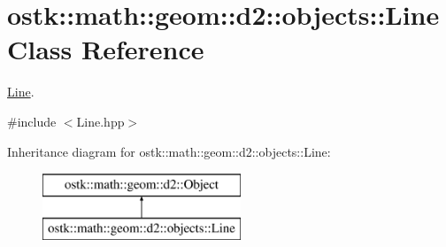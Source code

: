 \hypertarget{classostk_1_1math_1_1geom_1_1d2_1_1objects_1_1_line}{}\section{ostk\+:\+:math\+:\+:geom\+:\+:d2\+:\+:objects\+:\+:Line Class Reference}
\label{classostk_1_1math_1_1geom_1_1d2_1_1objects_1_1_line}


\hyperlink{classostk_1_1math_1_1geom_1_1d2_1_1objects_1_1_line}{Line}.  




{\ttfamily \#include $<$Line.\+hpp$>$}

Inheritance diagram for ostk\+:\+:math\+:\+:geom\+:\+:d2\+:\+:objects\+:\+:Line\+:\begin{figure}[H]
\begin{center}
\leavevmode
\includegraphics[height=2.000000cm]{classostk_1_1math_1_1geom_1_1d2_1_1objects_1_1_line}
\end{center}
\end{figure}
